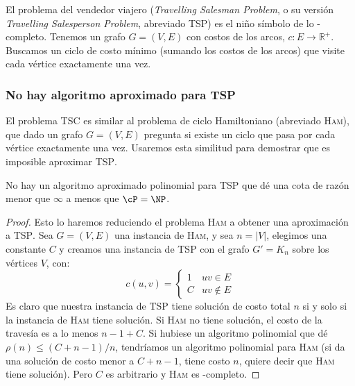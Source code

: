   El problema del vendedor viajero
  (\emph{\foreignlanguage{english}{Travelling Salesman Problem}},
   o su versión 
   \emph{\foreignlanguage{english}{Travelling Salesperson Problem}},
   abreviado \textsc{TSP})
  es el niño símbolo de lo \NP\nobreakdash-completo.
  Tenemos un grafo \(G = (V, E)\)
  con costos de los arcos,
  \(c \colon E \to \mathbb{R}^+\).
  Buscamos un ciclo de costo mínimo
  (sumando los costos de los arcos)
  que visite cada vértice exactamente una vez.

\subsubsection{No hay algoritmo aproximado para \textsc{TSP}}
\label{sec:TSP-no-aproximable}

  El problema \textsc{TSC} es similar al problema de ciclo Hamiltoniano
  (abreviado \textsc{Ham}),
  que dado un grafo \(G = (V, E)\)
  pregunta si existe un ciclo que pasa por cada vértice exactamente una vez.
  Usaremos esta similitud para demostrar
  que es imposible aproximar \textsc{TSP}.

  \begin{theorem}
    \label{theo:TSP-no-aproximable}
    No hay un algoritmo aproximado polinomial para \textsc{TSP}
    que dé una cota de razón menor que \(\infty\)
    a menos que \(\cP = \NP\).
  \end{theorem}
  \begin{proof}
    Esto lo haremos reduciendo el problema \textsc{Ham}
    a obtener una aproximación a \textsc{TSP}.
    Sea \(G = (V, E)\) una instancia de \textsc{Ham},
    y sea \(n = \lvert V \rvert\),
    elegimos una constante \(C\) y creamos una instancia de \textsc{TSP}
    con el grafo \(G' = K_n\) sobre los vértices \(V\),
    con:
    \begin{equation*}
      c(u, v)
        = \begin{cases}
            1 & u v \in E \\
            C & u v \notin E
          \end{cases}
    \end{equation*}
    Es claro que nuestra instancia de \textsc{TSP}
    tiene solución de costo total \(n\)
    si y solo si la instancia de \textsc{Ham} tiene solución.
    Si \textsc{Ham} no tiene solución,
    el costo de la travesía es a lo menos \(n - 1 + C\).
    Si hubiese un algoritmo polinomial
    que dé \(\rho(n) \le (C + n - 1) / n\),
    tendríamos un algoritmo polinomial para \textsc{Ham}
    (si da una solución de costo menor a \(C + n - 1\),
     tiene costo \(n\),
     quiere decir que \textsc{Ham} tiene solución).
    Pero \(C\) es arbitrario
    y \textsc{Ham} es \NP\nobreakdash-completo.
  \end{proof}

